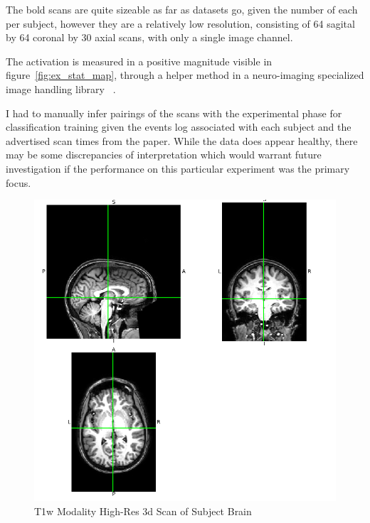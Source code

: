 The bold scans are quite sizeable as far as datasets go, given the number of each per subject,
however they are a relatively low resolution, consisting
of 64 sagital by 64 coronal by 30 axial scans, with only a single image channel.

The activation is measured in a positive magnitude visible in figure~\ref{fig:ex_stat_map}, through a helper method in a neuro-imaging specialized
image handling library ~\cite{brett_matthew_2019_3544468}.

I had to manually infer pairings of the scans with the experimental phase for classification training given the events log associated
with each subject and the advertised scan times from the paper.
While the data does appear healthy, there may be some discrepancies of interpretation which would warrant future investigation if the
performance on this particular experiment was the primary focus.


 \begin{figure}
  \includegraphics[width=\linewidth]{images/orthoview_t1w.png}
  \caption{T1w Modality High-Res 3d Scan of Subject Brain}
  \label{fig:ortho-t1w}
\end{figure}

